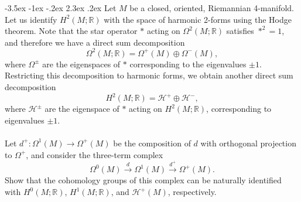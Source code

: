 \documentclass[10pt]{article}
\makeatletter
\renewcommand\section{\@startsection{section}{1}{\z@}%
                                  {-3.5ex \@plus -1ex \@minus -.2ex}%
                                  {2.3ex \@plus.2ex}%
                                  {\normalfont\large\bfseries}}
\newcommand{\R}{\ensuremath{\mathbb{R}}}
\DeclareMathOperator{\2}{II}
\makeatother
\begin{document}
\section{Let $M$ be a closed, oriented, Riemannian 4-manifold. Let us identify $H^2(M; \R)$ with the space of harmonic 2-forms using the Hodge theorem. Note that the star operator $*$ acting on $\Omega^2(M; \R)$ satisfies $*^2 =1$, and therefore we have a direct sum decomposition $$\Omega^2(M; \R) = \Omega^+(M) \oplus \Omega^- (M),$$ where $\Omega^\pm$ are the eigenspaces of $*$ corresponding to the eigenvalues $\pm 1$. Restricting this decomposition to harmonic forms, we obtain another direct sum decomposition $$H^2(M; \R) = \mathcal{H}^+ \oplus \mathcal{H}^-,$$ where $\mathcal{H}^\pm$ are the eigenspace of $*$ acting on $H^2(M; \R)$, corresponding to eigenvalues $\pm 1$. \\\\ Let $d^+ : \Omega^1(M) \to \Omega^+(M)$ be the composition of $d$ with orthogonal projection to $\Omega^+$, and consider the three-term complex $$\Omega^0(M) \stackrel{d}{\to} \Omega^1(M) \stackrel{d^+}{\to} \Omega^+(M).$$ Show that the cohomology groups of this complex can be naturally identified with $H^0(M; \R)$, $H^1(M; \R)$, and $\mathcal{H}^+(M)$, respectively.}
\end{document}
